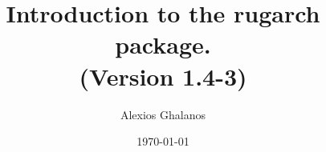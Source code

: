\documentclass[11pt,a4paper]{article}
\begin{document}

\title{Introduction to the rugarch package.\\
(Version 1.4-3)}
\author{Alexios Ghalanos}
\date{\today}
\maketitle
\tableofcontents
\newpage

\clearpage

\end{document}
